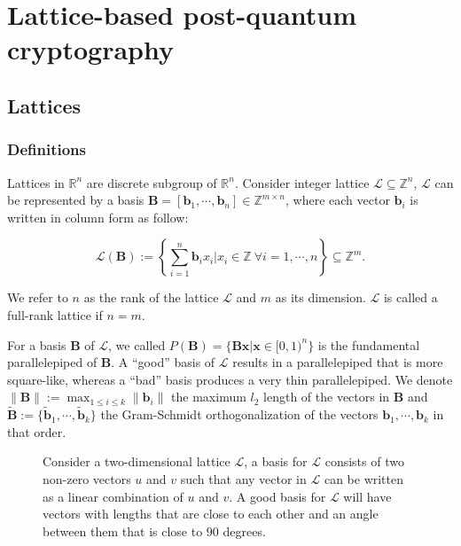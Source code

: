 \documentclass[cryptography,review,submit,pdftex,moreauthors,amsmath,amssymb,aps,strict]{Definitions/mdpi}
\begin{document}
\section{Lattice-based post-quantum cryptography} \label{post-quantum-cryptography-pqc}

\subsection{Lattices}
\subsubsection{Definitions}\label{lattice}
\begin{Definition}
    Lattices in $\mathbb{R}^n$ are discrete subgroup of $\mathbb{R}^n$. Consider integer lattice $\mathcal{L}\subseteq \mathbb{Z}^n$, $\mathcal{L}$ can be represented by a basis $\mathbf{B}=[\mathbf{b}_1,\cdots,\mathbf{b}_n]\in\mathbb{Z}^{m\times n}$, where each vector $\mathbf{b}_i$ is written in column form as follow: 

$$\mathcal{L}(\mathbf{B}):=\left\{\sum_{i=1}^n\mathbf{b}_i x_i | x_i\in\mathbb{Z}~\forall i=1,\cdots,n \right\}\subseteq\mathbb{Z}^m.$$ 
\end{Definition}

We refer to $n$ as the rank of the lattice $\mathcal{L}$ and $m$ as its dimension. $\mathcal{L}$ is called a full-rank lattice if $n=m$.

For a basis $\mathbf{B}$ of $\mathcal{L}$, we called $P(\mathbf{B})=\{\mathbf{B}\mathbf{x}|\mathbf{x}\in[0,1)^n\}$ is the fundamental parallelepiped of $\mathbf{B}$. A ``good'' basis of $\mathcal{L}$ results in a parallelepiped that is more square-like, whereas a ``bad'' basis produces a very thin parallelepiped. We denote$\|\mathbf{B}\|:=\max_{1 \le i \le k} \|\mathbf{b}_i\|$ the maximum $l_2$ length of the vectors in $\mathbf{B}$ and $\tilde{\mathbf{B}}:=\{\tilde{\mathbf{b}}_1,\cdots,\tilde{\mathbf{b}}_k \}$ the Gram-Schmidt orthogonalization of the vectors $\mathbf{b}_1,\cdots,\mathbf{b}_k$ in that order.
\begin{figure}[!htb]
    \centering
        
    \caption{Consider a two-dimensional lattice $\mathcal{L}$,  a basis for $\mathcal{L}$ consists of two non-zero vectors  $u$ and  $v$ such that any vector in $\mathcal{L}$ can be written as a linear combination of $u$ and $v$. A good basis for $\mathcal{L}$ will have vectors with lengths that are close to each other and an angle between them that is close to $90$ degrees.}
    \label{fig:lattice_basis}
\end{figure}
\end{document}
